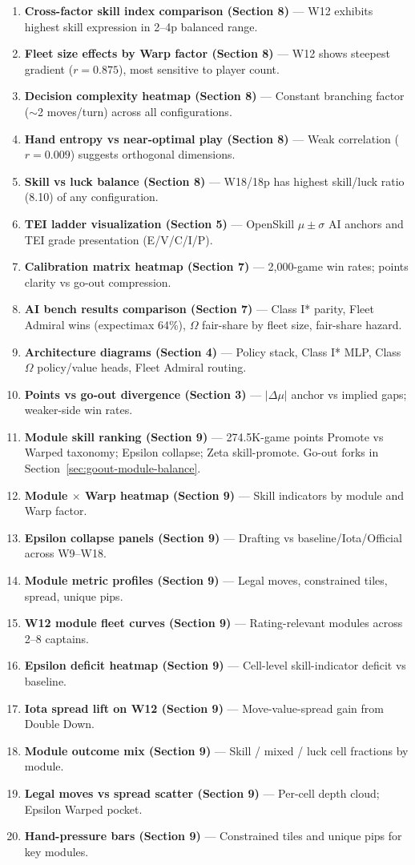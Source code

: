 \documentclass[11pt,letterpaper]{article}
\begin{document}
\begin{enumerate}
\item \textbf{Cross-factor skill index comparison (Section 8)} --- W12 exhibits highest skill expression in 2--4p balanced range.
\item \textbf{Fleet size effects by Warp factor (Section 8)} --- W12 shows steepest gradient ($r = 0.875$), most sensitive to player count.
\item \textbf{Decision complexity heatmap (Section 8)} --- Constant branching factor ($\sim$2 moves/turn) across all configurations.
\item \textbf{Hand entropy vs near-optimal play (Section 8)} --- Weak correlation ($r = 0.009$) suggests orthogonal dimensions.
\item \textbf{Skill vs luck balance (Section 8)} --- W18/18p has highest skill/luck ratio (8.10) of any configuration.
\item \textbf{TEI ladder visualization (Section 5)} --- OpenSkill $\mu\pm\sigma$ AI anchors and TEI grade presentation (E/V/C/I/P).
\item \textbf{Calibration matrix heatmap (Section 7)} --- 2{,}000-game win rates; points clarity vs go-out compression.
\item \textbf{AI bench results comparison (Section 7)} --- Class I* parity, Fleet Admiral wins (expectimax 64\%), $\Omega$ fair-share by fleet size, fair-share hazard.
\item \textbf{Architecture diagrams (Section 4)} --- Policy stack, Class I* MLP, Class $\Omega$ policy/value heads, Fleet Admiral routing.
\item \textbf{Points vs go-out divergence (Section 3)} --- $|\Delta\mu|$ anchor vs implied gaps; weaker-side win rates.
\item \textbf{Module skill ranking (Section 9)} --- 274.5K-game points Promote vs Warped taxonomy; Epsilon collapse; Zeta skill-promote. Go-out forks in Section~\ref{sec:goout-module-balance}.
\item \textbf{Module $\times$ Warp heatmap (Section 9)} --- Skill indicators by module and Warp factor.
\item \textbf{Epsilon collapse panels (Section 9)} --- Drafting vs baseline/Iota/Official across W9--W18.
\item \textbf{Module metric profiles (Section 9)} --- Legal moves, constrained tiles, spread, unique pips.
\item \textbf{W12 module fleet curves (Section 9)} --- Rating-relevant modules across 2--8 captains.
\item \textbf{Epsilon deficit heatmap (Section 9)} --- Cell-level skill-indicator deficit vs baseline.
\item \textbf{Iota spread lift on W12 (Section 9)} --- Move-value-spread gain from Double Down.
\item \textbf{Module outcome mix (Section 9)} --- Skill / mixed / luck cell fractions by module.
\item \textbf{Legal moves vs spread scatter (Section 9)} --- Per-cell depth cloud; Epsilon Warped pocket.
\item \textbf{Hand-pressure bars (Section 9)} --- Constrained tiles and unique pips for key modules.
\end{enumerate}
\end{document}
